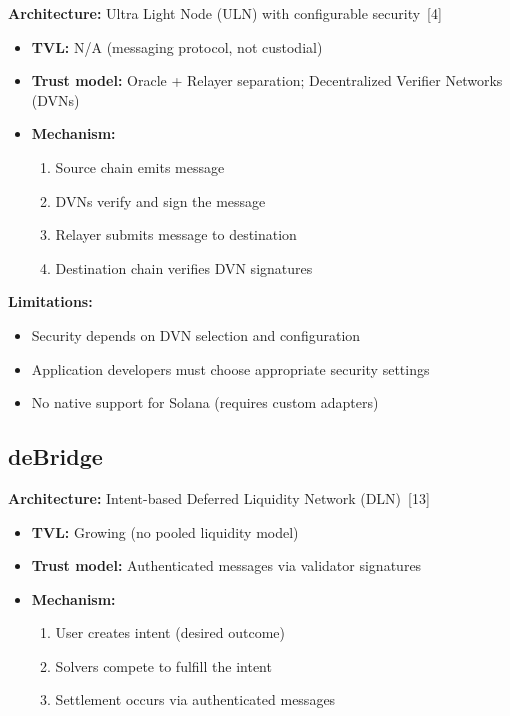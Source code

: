 \documentclass[11pt,a4paper,twoside]{article}
\begin{document}
\textbf{Architecture:} Ultra Light Node (ULN) with configurable security~[4]

\begin{itemize}
    \item \textbf{TVL:} N/A (messaging protocol, not custodial)
    \item \textbf{Trust model:} Oracle + Relayer separation; Decentralized Verifier Networks (DVNs)
    \item \textbf{Mechanism:}
    \begin{enumerate}
        \item Source chain emits message
        \item DVNs verify and sign the message
        \item Relayer submits message to destination
        \item Destination chain verifies DVN signatures
    \end{enumerate}
\end{itemize}

\textbf{Limitations:}
\begin{itemize}
    \item Security depends on DVN selection and configuration
    \item Application developers must choose appropriate security settings
    \item No native support for Solana (requires custom adapters)
\end{itemize}

\subsection{deBridge}

\textbf{Architecture:} Intent-based Deferred Liquidity Network (DLN)~[13]

\begin{itemize}
    \item \textbf{TVL:} Growing (no pooled liquidity model)
    \item \textbf{Trust model:} Authenticated messages via validator signatures
    \item \textbf{Mechanism:}
    \begin{enumerate}
        \item User creates intent (desired outcome)
        \item Solvers compete to fulfill the intent
        \item Settlement occurs via authenticated messages
    \end{enumerate}
\end{itemize}
\end{document}
